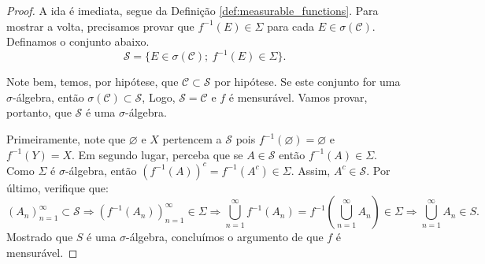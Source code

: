 \begin{proof}
    A ida é imediata, segue da Definição \ref{def:measurable_functions}. Para mostrar a volta, precisamos provar que $f^{-1}(E)\in\Sigma$ para cada $E\in \sigma(\mathcal{C})$. Definamos o conjunto abaixo.
    \begin{equation*}
        \mathcal{S}=\{E\in \sigma(\mathcal{C}); \ f^{-1}(E)\in \Sigma\}.
    \end{equation*}

    Note bem, temos, por hipótese, que $\mathcal{C}\subset \mathcal{S}$ por hipótese. Se este conjunto for uma $\sigma$-álgebra, então $\sigma(\mathcal{C}) \subset \mathcal{S}$, Logo, $\mathcal{S}=\mathcal{C}$ e $f$ é mensurável. Vamos provar, portanto, que $\mathcal{S}$ é uma $\sigma$-álgebra.

    Primeiramente, note que $\varnothing$ e $X$ pertencem a $\mathcal{S}$ pois $f^{-1}(\varnothing)=\varnothing$ e $f^{-1}(Y)=X$. Em segundo lugar, perceba que se $A\in \mathcal{S}$ então $f^{-1}(A)\in \Sigma$. Como $\Sigma$ é $\sigma$-álgebra, então $(f^{-1}(A))^{c}=f^{-1}(A^{c})\in \Sigma$. Assim, $A^{c}\in \mathcal{S}$. Por último, verifique que:
    \begin{equation*}
        \left(A_n\right)_{n=1}^\infty \subset \mathcal{S} \Rightarrow \left(f^{-1}(A_n)\right)_{n=1}^\infty \in \Sigma\Rightarrow  \bigcup_{n=1}^{\infty} f^{-1}(A_n)= f^{-1}\left(\bigcup_{n=1}^{\infty} A_n\right) \in \Sigma \Rightarrow \bigcup_{n=1}^{\infty} A_n\in S.
    \end{equation*}
    Mostrado que $S$ é uma $\sigma$-álgebra, concluímos o argumento de que $f$ é mensurável.
\end{proof}
